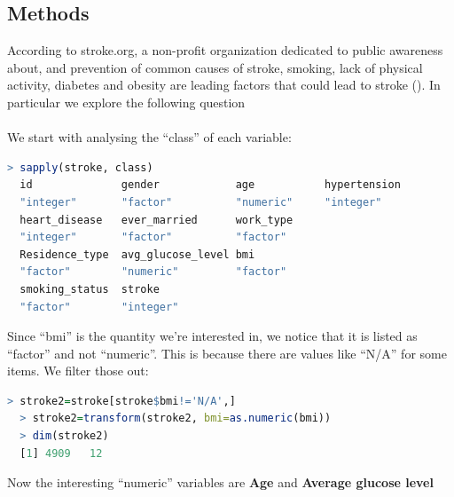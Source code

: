 \documentclass[boxes, qed]{homework}
\begin{document}
\subsection*{Methods}
According to stroke.org, a non-profit organization dedicated to public awareness about,
and prevention of common causes of stroke, smoking, lack of physical activity, diabetes and 
obesity are leading factors that could lead to stroke (\cite{strokeorg}).
In particular we explore the following question\\

\\

We start with analysing the ``class'' of each variable:
\begin{lstlisting}[backgroundcolor = \color{lightgray},language = R]
  > sapply(stroke, class)
  id              gender            age           hypertension
  "integer"       "factor"          "numeric"     "integer"
  heart_disease   ever_married      work_type 
  "integer"       "factor"          "factor" 
  Residence_type  avg_glucose_level bmi
  "factor"        "numeric"         "factor"
  smoking_status  stroke 
  "factor"        "integer" 
\end{lstlisting}
Since ``bmi'' is the quantity we're interested in, we notice that 
it is listed as ``factor'' and not ``numeric''. This is because
there are values like ``N/A'' for some items. We filter those out:
\begin{lstlisting}[backgroundcolor = \color{lightgray},language = R]
  > stroke2=stroke[stroke$bmi!='N/A',]
  > stroke2=transform(stroke2, bmi=as.numeric(bmi))
  > dim(stroke2)
  [1] 4909   12
\end{lstlisting}
Now the interesting ``numeric'' variables are
\textbf{Age} and \textbf{Average glucose level}
\end{document}
